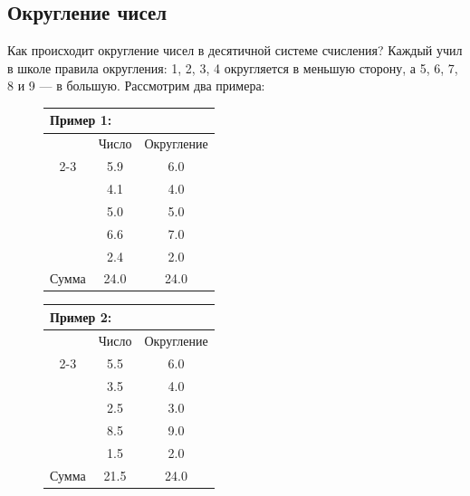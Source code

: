\subsection{Округление чисел}\label{subsec:notation-rounding}

Как происходит округление чисел в десятичной системе счисления?
Каждый учил в школе правила округления: 1, 2, 3, 4 округляется в меньшую сторону, а 5, 6, 7, 8 и 9 --- в большую.
Рассмотрим два примера:

\begin{figure}[H]
    \begin{minipage}[t]{.45\linewidth}
        \begin{tabular}{|c|c|c|}
            \multicolumn{3}{l}{Пример 1:} \\
            \hline
            & Число & Округление \\
            \cline{2-3}
            & \num{5.9} & \num{6.0} \\
            & \num{4.1} & \num{4.0} \\
            & \num{5.0} & \num{5.0} \\
            & \num{6.6} & \num{7.0} \\
            & \num{2.4} & \num{2.0} \\
            \hline
            Сумма & \num{24.0} & \num{24.0} \\
            \hline
        \end{tabular}
    \end{minipage}
    \hfill
    \begin{minipage}[t]{.45\linewidth}
        \begin{tabular}{|c|c|c|}
            \multicolumn{3}{l}{Пример 2:} \\
            \hline
            & Число & Округление \\
            \cline{2-3}
            & \num{5.5} & \num{6.0} \\
            & \num{3.5} & \num{4.0} \\
            & \num{2.5} & \num{3.0} \\
            & \num{8.5} & \num{9.0} \\
            & \num{1.5} & \num{2.0} \\
            \hline
            Сумма & \num{21.5} & \num{24.0} \\
            \hline
        \end{tabular}
    \end{minipage}
\end{figure}

